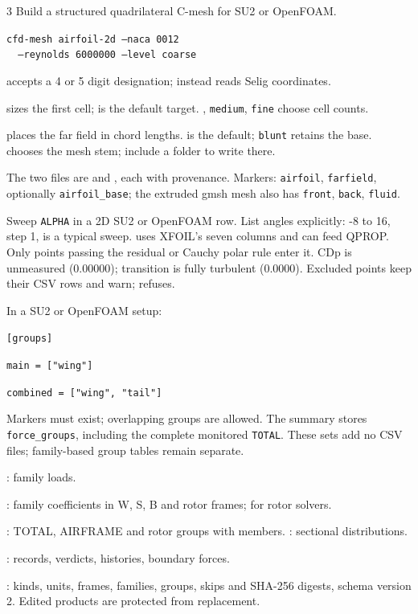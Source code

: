 \begin{multicols}{3}
\columnbreak
{}
Build a structured quadrilateral C-mesh for SU2 or OpenFOAM.\par
\texttt{cfd-mesh airfoil-2d --naca 0012}\\
\texttt{\ \ --reynolds 6000000 --level coarse}\par
{} accepts a 4 or 5 digit designation;
 instead reads Selig coordinates.\par
{} sizes the first cell;  is the default target.
, \texttt{medium}, \texttt{fine} choose cell counts.\par
{} places the far field in chord lengths.
 is the default; \texttt{blunt} retains the base.
 chooses the mesh stem; include a folder to write there.\par
The two files are  and , each with provenance.
Markers: \texttt{airfoil}, \texttt{farfield}, optionally \texttt{airfoil\_base};
the extruded gmsh mesh also has \texttt{front}, \texttt{back}, \texttt{fluid}.

Sweep \texttt{ALPHA} in a 2D SU2 or OpenFOAM row. List angles explicitly:
-8 to 16, step 1, is a typical sweep.
 uses XFOIL's seven columns and can feed QPROP.
Only points passing the residual or Cauchy polar rule enter it. CDp is
unmeasured (0.00000); transition is fully turbulent (0.0000).
Excluded points keep their CSV rows and warn;  refuses.

In a SU2 or OpenFOAM setup:\par
\texttt{[groups]}\par
\texttt{main = ["wing"]}\par
\texttt{combined = ["wing", "tail"]}\par
Markers must exist; overlapping groups are allowed. The summary stores
\texttt{force\_groups}, including the complete monitored \texttt{TOTAL}.
These sets add no CSV files; family-based group tables remain separate.

\columnbreak
{}
: family loads.\par
{}: family coefficients in W, S, B and rotor
frames;  for rotor solvers.\par
{}: TOTAL, AIRFRAME and rotor groups with
members. : sectional distributions.\par
{}: records, verdicts, histories, boundary forces.\par
{}: kinds, units, frames, families, groups, skips and SHA-256
digests, schema version 2. Edited products are protected from replacement.


\end{multicols}
